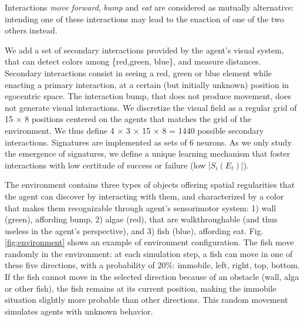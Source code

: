 \documentclass[conference]{IEEEtran}
\begin{document}
Interactions \textit{move forward}, \textit{bump} and \textit{eat} are considered as mutually alternative: intending one of these interactions may lead to the enaction of one of the two others instead. %

We add a set of secondary interactions provided by the agent’s visual system, that can detect colors among \{red,green, blue\}, and measure distances. 
Secondary interactions consist in seeing a red, green or blue element while enacting a primary interaction, at a certain (but initially unknown) position in egocentric space. 
The interaction bump, that does not produce movement, does not generate visual interactions. 
We discretize the visual field as a regular grid of 15 × 8 positions centered on the agents that matches the grid of the environment. 
We thus define 4 × 3 × 15 × 8 = 1440 possible secondary interactions.
Signatures are implemented as sets of 6 neurons. %
As we only study the emergence of signatures, we define a unique learning mechanism that foster interactions with low certitude of success or failure (low $|S_i(E_t)|$). 

The environment contains three types of objects offering spatial regularities that the agent can discover by interacting with them, and characterized by a color that makes them recognizable through agent's sensorimotor system: 1) wall (green), affording bump, 2) algae (red), that are walkthroughable (and thus useless in the agent's perspective), and 3) fish (blue), affording eat. Fig. \ref{fig:environment} shows an example of environment configuration.
The fish move randomly in the environment: at each simulation step, a fish can move in one of these five directions, with a probability of 20\%: immobile, left, right, top, bottom. If the fish cannot move in the selected direction because of an obstacle (wall, alga or other fish), the fish remains at its current position, making the immobile situation slightly more probable than other directions. This random movement simulates agents with unknown behavior.
\end{document}
